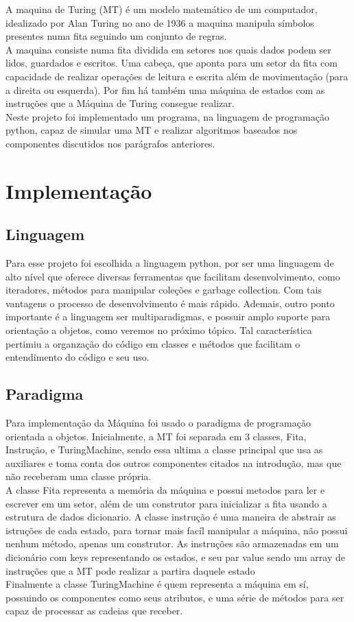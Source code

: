 \documentclass[a4paper, 12pt]{article}
\begin{document}
A maquina de Turing (MT) é um modelo matemático de um computador, idealizado por Alan Turing no ano de 1936 a maquina manipula símbolos presentes numa fita seguindo um conjunto de regras.\\
A maquina consiste numa fita dividida em setores nos quais dados podem ser lidos, guardados e escritos. Uma cabeça, que aponta para um setor da fita com capacidade de realizar operações de leitura e escrita além de movimentação (para a direita ou esquerda). Por fim há também uma máquina de estados com as instruções que a Máquina de Turing consegue realizar.\\
Neste projeto foi implementado um programa, na linguagem de programação python, capaz de simular uma MT e realizar algoritmos baseados nos componentes discutidos nos parágrafos anteriores.\\

\newpage
\section{Implementação}
\subsection{Linguagem}
Para esse projeto foi escolhida a linguagem python, por ser uma linguagem de alto nível que oferece diversas ferramentas que facilitam desenvolvimento, como iteradores, métodos para manipular coleções e garbage collection. Com tais vantagens o processo de desenvolvimento é mais rápido.
Ademais, outro ponto importante é a linguagem ser multiparadigmas, e possuir amplo suporte para orientação a objetos, como veremos no próximo tópico. Tal característica pertimiu a organzação do código em classes e métodos que facilitam o entendimento do código e seu uso.\\

\subsection{Paradigma}

Para implementação da Máquina foi usado o paradigma de programação orientada a objetos. Inicialmente, a MT foi separada em 3 classes, Fita, Instrução, e TuringMachine, sendo essa ultima a classe principal que usa as auxiliares e toma conta dos outros componentes citados na introdução, mas que não receberam uma classe própria.\\
A classe Fita representa a memória da máquina e possui metodos para ler e escrever em um setor, além de um construtor para inicializar a fita usando a estrutura de dados dicionario.
A classe instrução é uma maneira de abstrair as istruções de cada estado, para tornar mais facíl manipular a máquina, não possui nenhum método, apenas um construtor. As instruções são armazenadas em um dicionário com keys representando os estados, e seu par value sendo um array de instruções que a MT pode realizar a partira daquele estado\\
Finalmente a classe TuringMachine é quem representa a máquina em sí, possuindo os componentes como seus atributos, e uma série de métodos para ser capaz de processar as cadeias que receber.\\
\end{document}
